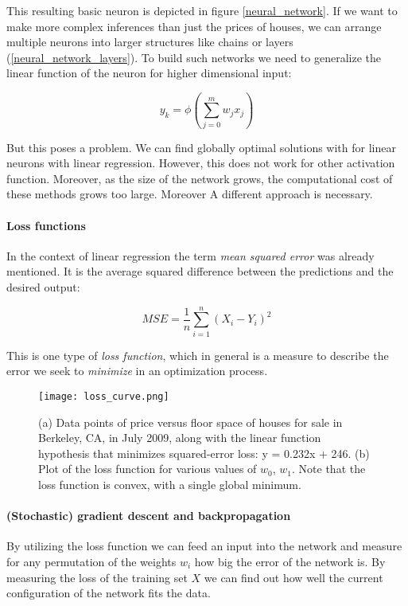 This resulting basic neuron is depicted in figure \ref{neural_network}. If we want to make more complex inferences than just the prices of houses, we can arrange multiple neurons into larger structures like chains or layers (\ref{neural_network_layers}). To build such networks we need to generalize the linear function of the neuron for higher dimensional input:

\begin{equation}
    y_k = \phi\left(\sum_{j=0}^{m}w_jx_j\right)
\end{equation}

But this poses a problem. We can find globally optimal solutions with for linear neurons with linear regression. However, this does not work for other activation function. Moreover, as the size of the network grows, the computational cost of these methods grows too large. Moreover A different approach is necessary.

\paragraph{Loss functions} In the context of linear regression the term \textit{mean squared error} was already mentioned. It is the average squared difference between the predictions and the desired output:

\begin{equation}
    MSE = \frac{1}{n} \sum_{i = 1}^{n}(X_i - Y_i)^2
\end{equation}

This is one type of \textit{loss function}, which in general is a measure to describe the error we seek to \textit{minimize} in an optimization process.

\begin{figure}
    \centering
    \texttt{[image: loss\_curve.png]}
    \caption{(a) Data points of price versus floor space of houses for sale in Berkeley, CA, in July 2009, along with the linear function hypothesis that minimizes squared-error loss: y = 0.232x + 246. (b) Plot of the loss function for various values of $ w_0 $, $ w_1 $. Note that the loss function is convex, with a single global minimum. \cite[p. 1251]{russell_artificial_2021}}
    \label{loss_curve}
\end{figure}

\paragraph{(Stochastic) gradient descent and backpropagation} By utilizing the loss function we can feed an input into the network and measure for any permutation of the weights $ w_i $ how big the error of the network is. By measuring the loss of the training set $ X $ we can find out how well the current configuration of the network fits the data.

